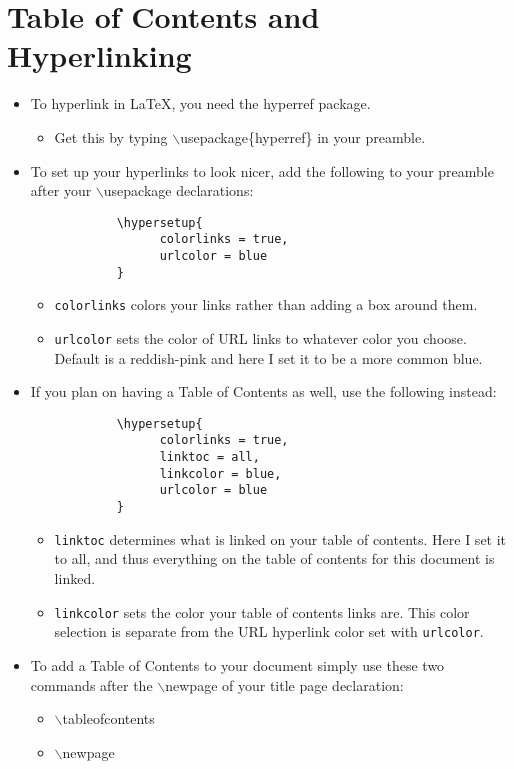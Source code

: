 \section{Table of Contents and Hyperlinking}
	\begin{itemize}
		\item To hyperlink in \LaTeX{}, you need the hyperref package.
		\begin{itemize}
			\item Get this by typing $\backslash$usepackage\{hyperref\} in your preamble.
		\end{itemize}
		\item To set up your hyperlinks to look nicer, add the following to your preamble after your $\backslash$usepackage declarations:
		\begin{verbatim}
			\hypersetup{
			      colorlinks = true,
			      urlcolor = blue
			}
		\end{verbatim}
		\begin{itemize}
			\item \texttt{colorlinks} colors your links rather than adding a box around them.
			\item \texttt{urlcolor} sets the color of URL links to whatever color you choose. Default is a reddish-pink and here I set it to be a more common blue.
		\end{itemize}
		\item If you plan on having a Table of Contents as well, use the following instead:
		\begin{verbatim}
			\hypersetup{
			      colorlinks = true,
			      linktoc = all,
			      linkcolor = blue,
			      urlcolor = blue
			}
		\end{verbatim}
		\begin{itemize}
			\item \texttt{linktoc} determines what is linked on your table of contents. Here I set it to all, and thus everything on the table of contents for this document is linked.
			\item \texttt{linkcolor} sets the color your table of contents links are. This color selection is separate from the URL hyperlink color set with \texttt{urlcolor}.
		\end{itemize}
		\item To add a Table of Contents to your document simply use these two commands after the $\backslash$newpage of your title page declaration:
		\begin{itemize}
			\item $\backslash$tableofcontents
			\item $\backslash$newpage
		\end{itemize}
	\end{itemize}


